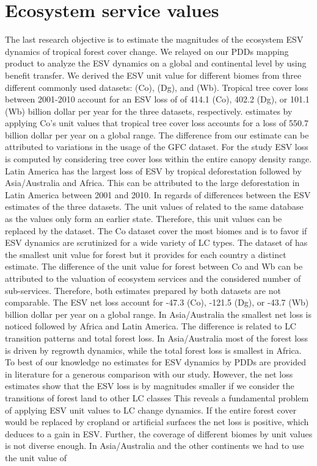	\section{Ecosystem service values}
		The last research objective is to estimate the magnitudes of the ecosystem \ac{ESV} dynamics of tropical forest cover change. We relayed on our \acp{PDD} mapping product to analyze the \ac{ESV} dynamics on a global and continental level by using benefit transfer. We derived the \ac{ESV} unit value for different biomes from three different commonly used datasets: \citet{Costanza2014} (Co), \citet{Groot2012} (Dg), and \citet{Siikamaki2015} (Wb). Tropical tree cover loss between 2001-2010 account for an \ac{ESV} loss of of 414.1 (Co), 402.2 (Dg), or 101.1 (Wb) billion dollar per year for the three datasets, respectively. \citet{Song2018} estimates by applying Co's unit values that tropical tree cover loss accounts for a loss of 550.7 billion dollar per year on a global range. The difference from our estimate can be attributed to variations in the usage of the \ac{GFC} dataset. For the study \ac{ESV} loss is computed by considering tree cover loss within the entire canopy density range. Latin America has the largest loss of \ac{ESV} by tropical deforestation followed by Asia/Australia and Africa. This can be attributed to the large deforestation in Latin America between 2001 and 2010. In regards of differences between the \ac{ESV} estimates of the three datasets. The unit values of \citet{Groot2012} related to the same database as the \citet{Costanza2014} values only form an earlier state. Therefore, this unit values can be replaced by the \citet{Costanza2014} dataset. The Co dataset cover the most biomes and is to favor if \ac{ESV} dynamics are scrutinized for a wide variety of \ac{LC} types. The dataset of \citet{Siikamaki2015} has the smallest unit value for forest but it provides for each country a distinct estimate. The difference of the unit value for forest between Co and Wb can be attributed to the valuation of ecosystem services and the considered number of sub-services. Therefore, both estimates prepared by both datasets are not comparable. The \ac{ESV} net loss account for -47.3 (Co), -121.5 (Dg), or -43.7 (Wb) billion dollar per year on a global range. In Asia/Australia the smallest net loss is noticed followed by Africa and Latin America. The difference is related to \ac{LC} transition patterns and total forest loss. In Asia/Australia most of the forest loss is driven by regrowth dynamics, while the total forest loss is smallest in Africa. To best of our knowledge no estimates for \ac{ESV} dynamics by \acp{PDD} are provided in literature for a generous comparison with our study. However, the net loss estimates show that the \ac{ESV} loss is by magnitudes smaller if we consider the transitions of forest land to other \ac{LC} classes This reveals a fundamental problem of applying \ac{ESV} unit values to \ac{LC} change dynamics. If the entire forest cover would be replaced by cropland or artificial surfaces the net loss is positive, which deduces to a gain in \ac{ESV}. Further, the coverage of different biomes by unit values is not diverse enough. In Asia/Australia and the other continents we had to use the unit value of 